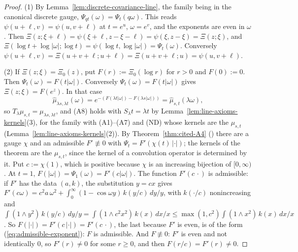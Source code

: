 \begin{proof}
\leanok
{}
(1) By Lemma~\ref{lem:discrete-covariance-line}, the family being in the canonical discrete gauge,
$\Psi_{qt}(\omega) = \Psi_t(q\omega)$. This reads $\psi(u + \ell, v) = \psi(u, v + \ell)$ at
$t = e^u$, $\omega = e^v$, and the exponents are even in $\omega$. Then
$\Xi(z;\xi + \ell) = \psi(\xi + \ell, z - \xi - \ell) = \psi(\xi, z - \xi) = \Xi(z;\xi)$, and
$\Xi(\log t + \log|\omega|;\log t) = \psi(\log t, \log|\omega|) = \Psi_t(\omega)$. Conversely
$\psi(u + \ell, v) = \Xi(u + v + \ell; u + \ell) = \Xi(u + v + \ell; u) = \psi(u, v + \ell)$.

(2) If $\Xi(z;\xi) = \Xi_0(z)$, put $F(r) := \Xi_0(\log r)$ for $r > 0$ and $F(0) := 0$. Then
$\Psi_t(\omega) = F(t|\omega|)$. Conversely $\Psi_t(\omega) = F(t|\omega|)$ gives
$\Xi(z;\xi) = F(e^z)$. In that case
\[
  \widehat\mu_{\lambda s,\lambda t}(\omega) = e^{-(F(\lambda t|\omega|) - F(\lambda s|\omega|))}
  = \widehat\mu_{s,t}(\lambda\omega),
\]
so $T_\lambda\mu_{s,t} = \mu_{\lambda s,\lambda t}$, and (A8) holds with $S_\lambda t = \lambda t$
by Lemma~\ref{lem:line-axioms-kernels}(3), for the family with (A1)--(A7) and (ND) whose kernels
are the $\mu_{s,t}$ (Lemma~\ref{lem:line-axioms-kernels}(2)). By Theorem~\ref{thm:cited-A4}
() there are a gauge $\chi$ and an admissible $F' \not\equiv 0$
with $\Psi_t = F'(\chi(t)\,|\cdot|)$; the kernels of the theorem are the $\mu_{s,t}$, since the
kernel of a convolution operator is determined by it. Put $c := \chi(1)$, which is positive because $\chi$ is an
increasing bijection of $[0,\infty)$. At $t = 1$, $F(|\omega|) = \Psi_1(\omega) = F'(c|\omega|)$.
The function $F'(c\,\cdot)$ is admissible: if $F'$ has the data $(a, k)$, the substitution
$y = cx$ gives $F'(c\omega) = c^2a\,\omega^2 + \int_0^\infty(1 - \cos\omega y)\,k(y/c)\,dy/y$, with
$k(\cdot/c)$ nonincreasing and
$\int(1 \wedge y^2)\,k(y/c)\,dy/y = \int(1 \wedge c^2x^2)\,k(x)\,dx/x \le
\max(1, c^2)\int(1 \wedge x^2)\,k(x)\,dx/x$. So $F(|\cdot|) = F'(c\,|\cdot|) = F'(c\,\cdot)$, the
last because $F'$ is even, is of the form (\ref{eq:admissible-exponent}): $F$ is admissible. And $F \not\equiv 0$:
$F'$ is even and not identically $0$, so $F'(r) \ne 0$ for some $r \ge 0$, and then
$F(r/c) = F'(r) \ne 0$.


\end{proof}
